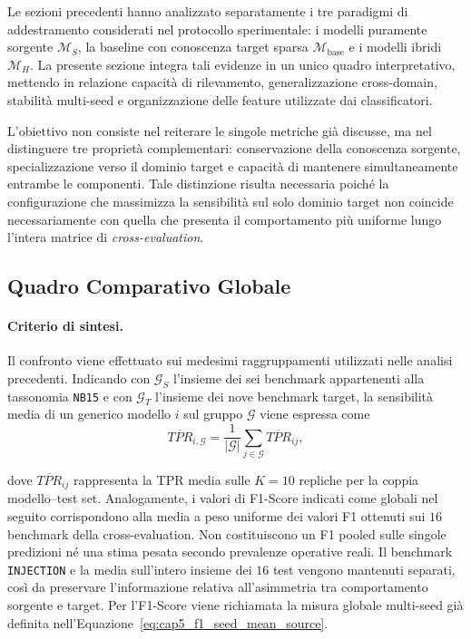Le sezioni precedenti hanno analizzato separatamente i tre paradigmi di addestramento considerati nel protocollo sperimentale: i modelli puramente sorgente $\mathcal{M}_{S}$, la baseline con conoscenza target sparsa $\mathcal{M}_{\mathrm{base}}$ e i modelli ibridi $\mathcal{M}_{H}$.
La presente sezione integra tali evidenze in un unico quadro interpretativo, mettendo in relazione capacità di rilevamento, generalizzazione cross-domain, stabilità multi-seed e organizzazione delle feature utilizzate dai classificatori.

L'obiettivo non consiste nel reiterare le singole metriche già discusse, ma nel distinguere tre proprietà complementari: conservazione della conoscenza sorgente, specializzazione verso il dominio target e capacità di mantenere simultaneamente entrambe le componenti. 
Tale distinzione risulta necessaria poiché la configurazione che massimizza la sensibilità sul solo dominio target non coincide necessariamente con quella che presenta il comportamento più uniforme lungo l'intera matrice di \textit{cross-evaluation}.



\subsection{Quadro Comparativo Globale}
\label{subsec:quadro_comparativo_globale}

\paragraph{Criterio di sintesi.}
Il confronto viene effettuato sui medesimi raggruppamenti utilizzati nelle analisi precedenti. 
Indicando con $\mathcal{G}_{S}$ l'insieme dei sei benchmark appartenenti alla tassonomia \texttt{NB15} e con $\mathcal{G}_{T}$ l'insieme dei nove benchmark target, la sensibilità media di un generico modello $i$ sul gruppo $\mathcal{G}$ viene espressa come
\begin{equation}
    \overline{TPR}_{i,\mathcal{G}}
    =
    \frac{1}{|\mathcal{G}|}
    \sum_{j\in\mathcal{G}}
    \overline{TPR}_{ij},
    \label{eq:cap5_global_group_tpr}
\end{equation}

dove $\overline{TPR}_{ij}$ rappresenta la TPR media sulle $K=10$ repliche per la coppia modello--test set. 
Analogamente, i valori di F1-Score indicati come globali nel seguito corrispondono alla media a peso uniforme dei valori F1 ottenuti sui $16$ benchmark della cross-evaluation. Non costituiscono un F1 pooled sulle singole predizioni né una stima pesata secondo prevalenze operative reali.
Il benchmark \texttt{INJECTION} e la media sull'intero insieme dei $16$ test vengono mantenuti separati, così da preservare l'informazione relativa all'asimmetria tra comportamento sorgente e target. 
Per l'F1-Score viene richiamata la misura globale multi-seed già definita nell'Equazione~\eqref{eq:cap5_f1_seed_mean_source}.


